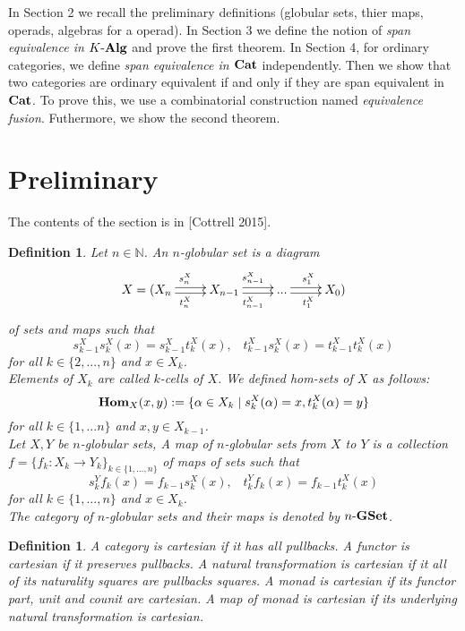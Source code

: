 \documentclass[12pt]{article}
\theoremstyle{plain}
\newtheorem{definition}[theorem]{Definition}
\theoremstyle{definition}
\begin{document}
In Section 2 we recall the preliminary definitions (globular sets, thier maps, operads, algebras for a operad). In Section 3 we define the notion of \emph{span equivalence in $K \mathchar`- {\bf Alg}$} and prove the first theorem. In Section 4, for ordinary categories, we define \emph{span equivalence in ${\bf Cat}$} independently. Then we show that two categories are ordinary equivalent if and only if they are span equivalent in ${\bf Cat}$. To prove this, we use a combinatorial construction named \emph{equivalence fusion}. Futhermore, we show the second theorem.

\section{Preliminary}
The contents of the section is in [Cottrell 2015].

\begin{definition}
Let $n \in \mathbb{N}$. An {\em$n$-globular set} is a diagram 
\[
\xymatrix{
X = ( X_n \ar@<0.5ex>[r]^{s_n^X} \ar@<-0.5ex>[r]_{t_n^X} & X_{n-1} \ar@<0.5ex>[r]^{s_{n-1}^X} \ar@<-0.5ex>[r]_{t_{n-1}^X} 
 & ... \ar@<0.5ex>[r]^{s_1^X} \ar@<-0.5ex>[r]_{t_1^X} & X_{0}  )
 }
\]
of sets and maps such that
\[
s_{k-1}^X s_{k}^X (x) =s_{k-1}^X t_{k}^X (x) , \hspace{10pt} t_{k-1}^X s_{k}^X (x) = t_{k-1}^X t_{k}^X (x)
\]
for all $k \in \{ 2,...,n \} $ and $x \in X_k$. \\
Elements of $X_k$ are called {\em$k$-cells} of $X$. We defined {\em hom-sets} of $X$ as follows:
\[
{\bf Hom}_{X}(x,y) := \{ \alpha \in X_k \mid s_k^X(\alpha)=x, t_k^X(\alpha)=y \}
\] 
for all $k \in \{ 1,...n \} $ and $x,y \in X_{k-1}$.\\
Let $X,Y$ be $n$-globular sets, A \emph{map} of $n$-globular sets from $X$ to $Y$ is a collection $f=\{ f_{k}: X_{k} \rightarrow Y_{k} \}_{k \in \{ 1,...,n \}}$ of maps of sets such that 
\[
s_k^Y f_k (x) = f_{k-1} s_{k}^X (x) , \hspace{10pt} t_{k}^Y f_k (x) = f_{k-1} t_{k}^X (x)
\]
for all $k \in \{ 1,...,n \} $ and $x \in X_{k}$. \\
The category of $n$-globular sets and their maps is denoted by $n \mathchar`- {\bf GSet}$.
\end{definition}

\begin{definition}
A category is {\em cartesian} if it has all pullbacks. A functor is {\em cartesian} if it preserves pullbacks. A natural transformation is {\em cartesian} if it all of its naturality squares are pullbacks squares. A monad is {\em cartesian} if its functor part, unit and counit are cartesian. A map of monad is {\em cartesian} if its underlying natural transformation is cartesian.
\end{definition}
\end{document}
